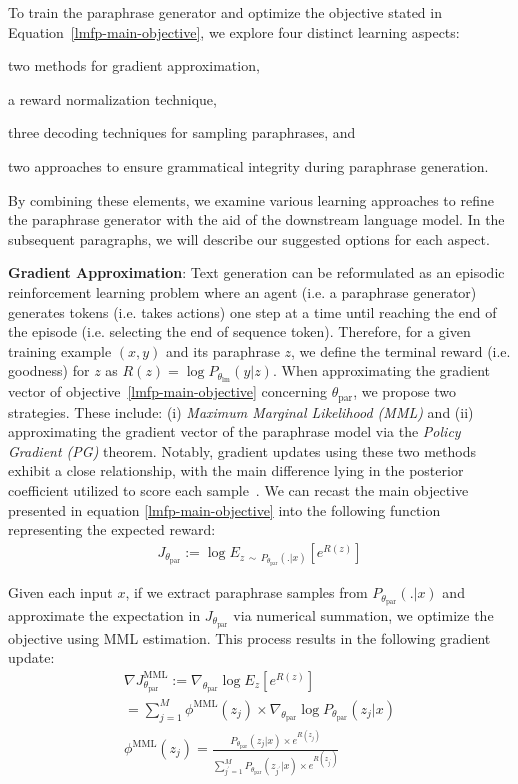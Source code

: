\documentclass[11pt]{article}
\begin{document}
To train the paraphrase generator and optimize the objective stated in Equation~\ref{lmfp-main-objective}, we explore four distinct learning aspects:
\begin{inparaenum}[(a)]
\item two methods for gradient approximation,
\item a reward normalization technique,
\item three decoding techniques for sampling paraphrases, and
\item two approaches to ensure grammatical integrity during paraphrase generation.
\end{inparaenum}
By combining these elements, we examine various learning approaches to refine the paraphrase generator with the aid of the downstream language model. In the subsequent paragraphs, we will describe our suggested options for each aspect.

\textbf{Gradient Approximation}:
\noindent
Text generation can be reformulated as an episodic reinforcement learning problem where an agent (i.e. a paraphrase generator) generates tokens (i.e. takes actions) one step at a time until reaching the end of the episode (i.e. selecting the end of sequence token). Therefore, for a given training example $(x, y)$ and its paraphrase $z$, we define the terminal reward (i.e. goodness) for $z$ as $R(z) = \log P_{\theta_{\text{lm}}} (y | z)$. When approximating the gradient vector of objective~\ref{lmfp-main-objective} concerning $\theta_{\text{par}}$, we propose two strategies. These include: (i) \emph{Maximum Marginal Likelihood (MML)} and (ii) approximating the gradient vector of the paraphrase model via the \emph{Policy Gradient (PG)} theorem. Notably, gradient updates using these two methods exhibit a close relationship, with the main difference lying in the posterior coefficient utilized to score each sample~\cite{guu-etal-2017-language}. We can recast the main objective presented in equation \ref{lmfp-main-objective} into the following function representing the expected reward:
\begin{multline}
J_{\theta_{\text{par}}} := \log E_{z \, \sim \, P_{\theta_{\text{par}}}(.|x)} [e^{R(z)}]
\label{lmfp-expect-objective}
\end{multline}

Given each input $x$, if we extract paraphrase samples from $P_{\theta_{\text{par}}}(.|x)$ and approximate the expectation in $J_{\theta_{\text{par}}}$ via numerical summation, we optimize the objective using MML estimation. This process results in the following gradient update:
\begin{multline}
\nabla J^{\text{MML}}_{\theta_{\text{par}}} := \nabla_{\theta_{\text{par}}} \log E_{z} [e^{R(z)}] \\ =
\sum^{M}_{j=1} \phi^{\text{MML}}(z_{j}) \times \nabla_{\theta_{\text{par}}} \log P_{\theta_{\text{par}}}(z_{j}|x) \\
\phi^{\text{MML}}(z_{j}) = \frac{P_{\theta_{\text{par}}}(z_{j}|x) \times e^{R(z_{j})}}{\sum^{M}_{j^{'}=1} P_{\theta_{\text{par}}}(z_{j^{'}}|x) \times e^{R(z_{j^{'}})}}
\label{mml-objective}
\end{multline}
\end{document}
